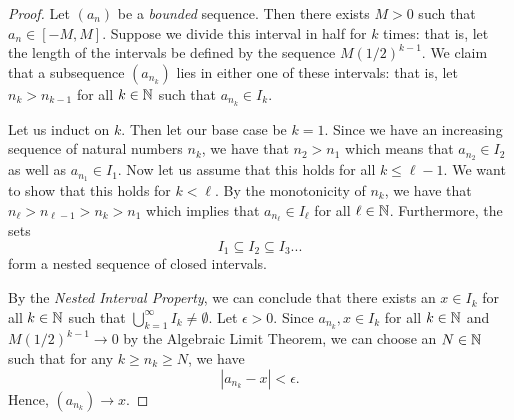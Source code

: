 \begin{proof}
    Let \( (a_n)\) be a \textit{bounded} sequence. Then there exists \( M > 0 \) such that \( a_n \in [-M,M ]\). Suppose we divide this interval in half for \( k \) times: that is, let the length of the intervals be defined by the sequence \( M (1/2)^{k-1}\). We claim that a subsequence \( (a_{n_k})\) lies in either one of these intervals: that is, let \( n_{k} > n_{k-1}\) for all \( k \in \mathbb{N} \) such that \( a_{n_k} \in I_k\). 

    Let us induct on \( k\). Then let our base case be \( k = 1 \). Since we have an increasing sequence of natural numbers \( n_k\), we have that \( n_2 > n_1 \) which means that \( a_{n_2} \in I_2\) as well as \( a_{n_1} \in I_1\). Now let us assume that this holds for all \( k \leq \ell - 1 \). We want to show that this holds for \( k < \ell \). By the monotonicity of \( n_k \), we have that \( n_{\ell} > n_{\ell - 1} > n_k > n_1\) which implies that \( a_{n_\ell} \in I_\ell\) for all \( \ell \in \mathbb{N} \). Furthermore, the sets 
    \[ I_1 \subseteq I_2 \subseteq I_3 ...\]
form a nested sequence of closed intervals.

    By the \textit{Nested Interval Property}, we can conclude that there exists an \( x \in I_k\) for all \( k \in \mathbb{N} \)  such that \( \bigcup_{k=1}^{ \infty} I_k \neq \emptyset\). Let \( \epsilon > 0  \). Since \( a_{n_k}, x \in I_k \) for all \( k \in \mathbb{N} \) and \( M (1/2)^{k-1} \to 0\) by the Algebraic Limit Theorem, we can choose an \( N \in \mathbb{N} \) such that for any \( k \geq n_k \geq N \), we have
    \[ |a_{n_k} - x | < \epsilon.\] 
    Hence, \( (a_{n_k}) \to x \).
\end{proof}%




